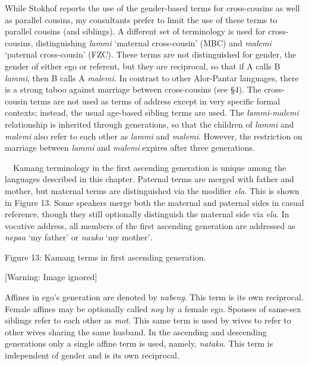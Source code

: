While Stokhof reports the use of the gender-based terms for cross-cousins as well as parallel cousins, my consultants prefer to limit the use of these terms to parallel cousins (and siblings). A different set of terminology is used for cross-cousins, distinguishing \textit{lammi }{\textquoteleft}maternal cross-cousin{\textquoteright} (MBC) and \textit{malemi }{\textquoteleft}paternal cross-cousin{\textquoteright} (FZC). These terms are not distinguished for gender, the gender of either ego or referent, but they are reciprocal, so that if A calls B \textit{lammi}, then B calls A \textit{malemi.} In contrast to other Alor-Pantar languages, there is a strong taboo against marriage between cross-cousins (see {\S}4). The cross-cousin terms are not used as terms of address except in very specific formal contexts; instead, the usual age-based sibling terms are used. The \textit{lammi-malemi }relationship is inherited through generations, so that the children of \textit{lammi }and \textit{malemi} also refer to each 
other as \textit{lammi }and \textit{malemi}. However, the restriction on marriage between \textit{lammi }and \textit{malemi }expires after three generations.

\ \ Kamang terminology in the first ascending generation is unique among the languages described in this chapter. Paternal terms are merged with father and mother, but maternal terms are distinguished via the modifier \textit{ela}. This is shown in Figure 13. Some speakers merge both the maternal and paternal sides in casual reference, though they still optionally distinguish the maternal side via \textit{ela}. In vocative address, all members of the first ascending generation are addressed as \textit{nepaa} {\textquoteleft}my father{\textquoteright}\textit{ }or \textit{nauko }{\textquoteleft}my mother{\textquoteright}\textit{. }

{\centering
Figure 13: Kamang terms in first ascending generation.
\par}

  [Warning: Image ignored] %
 

Affines in ego{\textquoteright}s generation are denoted by \textit{nabeng}. This term is its own reciprocal. Female affines may be optionally called \textit{noy }by a female ego. Spouses of same-sex siblings refer to each other as \textit{mot}. This same term is used by wives to refer to other wives sharing the same husband. In the ascending and descending generations only a single affine term is used, namely, \textit{nataka}. This term is independent of gender and is its own reciprocal. 

